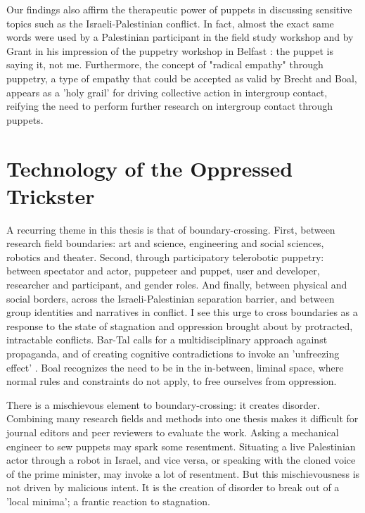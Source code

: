 \documentclass[dissertation,math,vertlayout,pdfa,colorlinks]{aaltoseries}
\begin{document}
Our findings also affirm the therapeutic power of puppets in discussing sensitive topics such as the Israeli-Palestinian conflict. In fact, almost the exact same words were used by a Palestinian participant in the field study workshop and by Grant in his impression of the puppetry workshop in Belfast \cite{grantObjectsObjectivesApplied2020}: the puppet is saying it, not me. Furthermore, the concept of "radical empathy" through puppetry, a type of empathy that could be accepted as valid by Brecht and Boal, appears as a 'holy grail' for driving collective action in intergroup contact, reifying the need to perform further research on intergroup contact through puppets.

\section{Technology of the Oppressed Trickster}
A recurring theme in this thesis is that of boundary-crossing. First, between research field boundaries: art and science, engineering and social sciences, robotics and theater. Second, through participatory telerobotic puppetry: between spectator and actor, puppeteer and puppet, user and developer, researcher and participant, and gender roles. And finally, between physical and social borders, across the Israeli-Palestinian separation barrier, and between group identities and narratives in conflict. I see this urge to cross boundaries as a response to the state of stagnation and oppression brought about by protracted, intractable conflicts. Bar-Tal calls for a multidisciplinary approach against propaganda, and of creating cognitive contradictions to invoke an 'unfreezing effect' \cite{bar-talDanielBartalIsraelipalestinian2024}. Boal recognizes the need to be in the in-between, liminal space, where normal rules and constraints do not apply, to free ourselves from oppression. 

There is a mischievous element to boundary-crossing: it creates disorder. Combining many research fields and methods into one thesis makes it difficult for journal editors and peer reviewers to evaluate the work. Asking a mechanical engineer to sew puppets may spark some resentment. Situating a live Palestinian actor through a robot in Israel, and vice versa, or speaking with the cloned voice of the prime minister, may invoke a lot of resentment. But this mischievousness is not driven by malicious intent. It is the creation of disorder to break out of a 'local minima'; a frantic reaction to stagnation. 
\end{document}
